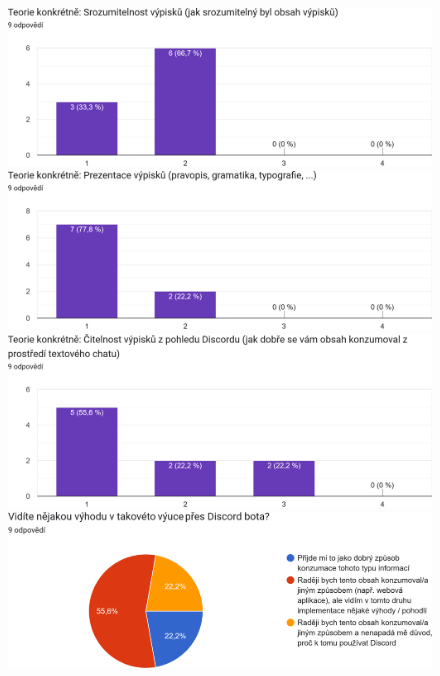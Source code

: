 \documentclass[FM]{tulthesis}
\begin{document}
	\begin{figure}[ht]
		\centering
		\includegraphics[width=\textwidth]{img/questionnaire/7}\bigskip\par
		\includegraphics[width=\textwidth]{img/questionnaire/8}\bigskip\par
		\includegraphics[width=\textwidth]{img/questionnaire/9}\bigskip\par
		\includegraphics[width=\textwidth]{img/questionnaire/10}\bigskip\par
	\end{figure}
\end{document}
